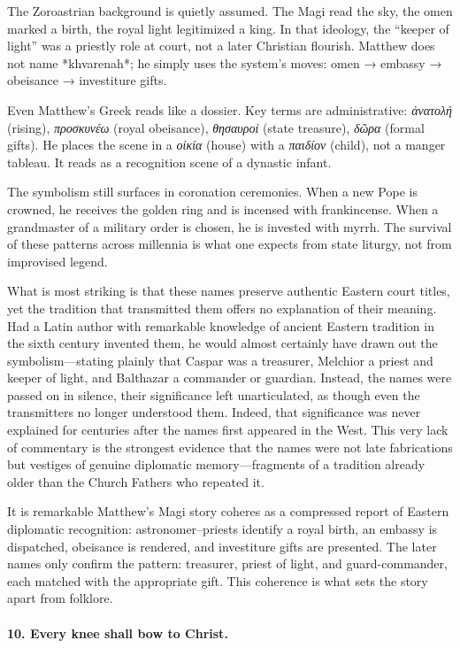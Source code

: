 The Zoroastrian background is quietly assumed.
The Magi read the sky, the omen marked a birth, the royal light legitimized a king.
In that ideology, the “keeper of light” was a priestly role at court, not a later Christian flourish.
Matthew does not name *khvarenah*; he simply uses the system’s moves: omen → embassy → obeisance → investiture gifts.

Even Matthew’s Greek reads like a dossier.
Key terms are administrative: \textit{ἀνατολή} (rising), \textit{προσκυνέω} (royal obeisance), \textit{θησαυροί} (state treasure), \textit{δῶρα} (formal gifts).
He places the scene in a \textit{οἰκία} (house) with a \textit{παιδίον} (child), not a manger tableau.
It reads as a recognition scene of a dynastic infant.

The symbolism still surfaces in coronation ceremonies.
When a new Pope is crowned, he receives the golden ring and is incensed with frankincense.
When a grandmaster of a military order is chosen, he is invested with myrrh.
The survival of these patterns across millennia is what one expects from state liturgy, not from improvised legend.

What is most striking is that these names preserve authentic Eastern court titles, yet the tradition that transmitted them offers no explanation of their meaning.
Had a Latin author with remarkable knowledge of ancient Eastern tradition in the sixth century invented them, he would almost certainly have drawn out the symbolism—stating plainly that Caspar was a treasurer, Melchior a priest and keeper of light, and Balthazar a commander or guardian.
Instead, the names were passed on in silence, their significance left unarticulated, as though even the transmitters no longer understood them.
Indeed, that significance was never explained for centuries after the names first appeared in the West.
This very lack of commentary is the strongest evidence that the names were not late fabrications but vestiges of genuine diplomatic memory—fragments of a tradition already older than the Church Fathers who repeated it.

It is remarkable Matthew’s Magi story coheres as a compressed report of Eastern diplomatic recognition: astronomer–priests identify a royal birth, an embassy is dispatched, obeisance is rendered, and investiture gifts are presented.
The later names only confirm the pattern: treasurer, priest of light, and guard-commander, each matched with the appropriate gift.
This coherence is what sets the story apart from folklore.

\paragraph{10.
Every knee shall bow to Christ.}\label{par:every-knee-shall-bow-to-christ.}

